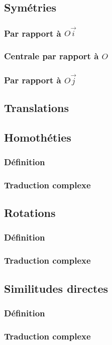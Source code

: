 \documentclass[12pt,a4paper,french]{book}
\begin{document}
		\subsection{Symétries}
			\subsubsection{Par rapport à $O\overrightarrow{i}$}
			\subsubsection{Centrale par rapport à $O$}
			\subsubsection{Par rapport à $O\overrightarrow{j}$}
		\subsection{Translations}
		\subsection{Homothéties}
			\subsubsection{Définition}
			\subsubsection{Traduction complexe}
		\subsection{Rotations}
			\subsubsection{Définition}
			\subsubsection{Traduction complexe}
		\subsection{Similitudes directes}
			\subsubsection{Définition}
			\subsubsection{Traduction complexe}
\end{document}
